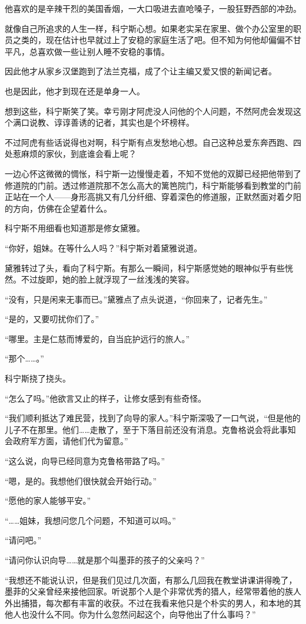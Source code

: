 他喜欢的是辛辣干烈的美国香烟，一大口吸进去直呛嗓子，一股狂野西部的冲劲。

就像自己所追求的人生一样，科宁斯心想。如果老实呆在家里、做个办公室里的职员之类的，现在估计也早就过上了安稳的家庭生活了吧。但不知为何他却偏偏不甘平凡，总喜欢做一些让别人睡不安稳的事情。

因此他才从家乡汉堡跑到了法兰克福，成了个让主编又爱又恨的新闻记者。

也是因此，他才到现在还是单身一人。

想到这些，科宁斯笑了笑。幸亏刚才阿虎没人问他的个人问题，不然阿虎会发现这个满口说教、谆谆善诱的记者，其实也是个坏榜样。

不过阿虎有些话说得也对啊，科宁斯有点发愁地心想。自己这种总爱东奔西跑、四处惹麻烦的家伙，到底谁会看上呢？

一边心怀这微微的惆怅，科宁斯一边慢慢走着，不知不觉他的双脚已经把他带到了修道院的门前。透过修道院那不怎么高大的篱笆院门，科宁斯能够看到教堂的门前正站在一个人——身形高挑又有几分纤细、穿着深色的修道服，正默然面对着夕阳的方向，仿佛在企望着什么。

科宁斯不用细看也知道那是修女黛雅。

“你好，姐妹。在等什么人吗？”科宁斯对着黛雅说道。

黛雅转过了头，看向了科宁斯。有那么一瞬间，科宁斯感觉她的眼神似乎有些恍然。不过旋即，她的脸上就浮现了一丝浅浅的笑容。

“没有，只是闲来无事而已。”黛雅点了点头说道，“你回来了，记者先生。”

“是的，又要叨扰你们了。”

“哪里。主是仁慈而博爱的，自当庇护远行的旅人。”

“那个……。”

科宁斯挠了挠头。

“怎么了吗。”他欲言又止的样子，让修女感到有些奇怪。

“我们顺利抵达了难民营，找到了向导的家人。”科宁斯深吸了一口气说，“但是他的儿子不在那里。他们……走散了，至于下落目前还没有消息。克鲁格说会将此事知会政府军方面，请他们代为留意。”

“这么说，向导已经同意为克鲁格带路了吗。”

“嗯，是的。我想他们很快就会开始行动。”

“愿他的家人能够平安。”

“……姐妹，我想问您几个问题，不知道可以吗。”

“请问吧。”

“请问你认识向导……就是那个叫墨菲的孩子的父亲吗？”

“我想还不能说认识，但是我们见过几次面，有那么几回我在教堂讲课讲得晚了，墨菲的父亲曾经来接他回家。听说那个人是个非常优秀的猎人，经常带着他的族人外出捕猎，每次都有丰富的收获。不过在我看来他只是个朴实的男人，和本地的其他人也没什么不同。你为什么忽然问起这个，向导他出了什么事吗？”

